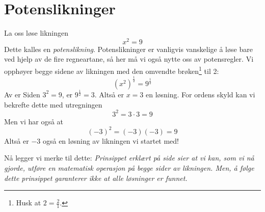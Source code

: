 \newpage
{} \vsk
{}
\newpage
{}
\section{Potenslikninger}
La oss løse likningen
\[ x^2=9 \]
Dette kalles en \textit{potenslikning}. Potenslikninger er vanligvis vanskelige å løse bare ved hjelp av de fire regneartane, så her må vi også nytte oss av potensregler. Vi opphøyer begge sidene av likningen med den omvendte brøken\footnote{Husk at $ 2=\frac{2}{1} $.} til 2:
\[ \left(x^2\right)^\frac{1}{2}=9^\frac{1}{2} \]
Av  er
Siden $ 3^2=9 $, er $ 9^\frac{1}{2}=3 $. Altså er $ {x=3} $ en løsning. For ordens skyld kan vi bekrefte dette med utregningen
\[ 3^2=3\cdot3=9 \]
Men vi har også at
\[ (-3)^2=(-3)(-3)=9 \]
Altså er $ -3 $ også en løsning av likningen vi startet med! \vsk

Nå legger vi merke til dette: \textsl{Prinsippet erklært på side \pageref{principle} sier at vi kan, som vi nå gjorde, utføre en matematisk operasjon på begge sider av likningen. Men, å følge dette prinsippet garanterer ikke at alle løsninger er funnet.}\regv

